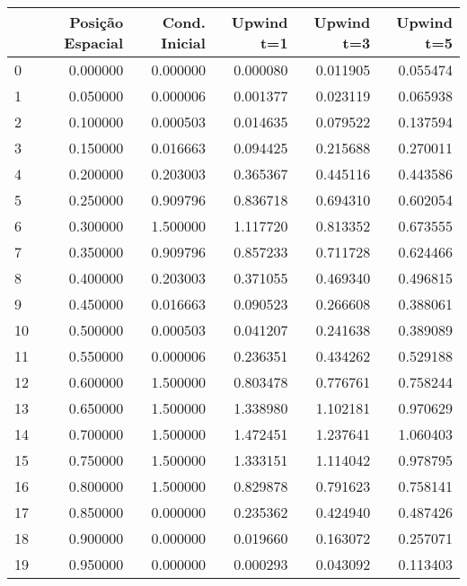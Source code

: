 \begin{tabular}{lrrrrr}
\toprule
 & Posição Espacial & Cond. Inicial & Upwind t=1 & Upwind t=3 & Upwind t=5 \\
\midrule
0 & 0.000000 & 0.000000 & 0.000080 & 0.011905 & 0.055474 \\
1 & 0.050000 & 0.000006 & 0.001377 & 0.023119 & 0.065938 \\
2 & 0.100000 & 0.000503 & 0.014635 & 0.079522 & 0.137594 \\
3 & 0.150000 & 0.016663 & 0.094425 & 0.215688 & 0.270011 \\
4 & 0.200000 & 0.203003 & 0.365367 & 0.445116 & 0.443586 \\
5 & 0.250000 & 0.909796 & 0.836718 & 0.694310 & 0.602054 \\
6 & 0.300000 & 1.500000 & 1.117720 & 0.813352 & 0.673555 \\
7 & 0.350000 & 0.909796 & 0.857233 & 0.711728 & 0.624466 \\
8 & 0.400000 & 0.203003 & 0.371055 & 0.469340 & 0.496815 \\
9 & 0.450000 & 0.016663 & 0.090523 & 0.266608 & 0.388061 \\
10 & 0.500000 & 0.000503 & 0.041207 & 0.241638 & 0.389089 \\
11 & 0.550000 & 0.000006 & 0.236351 & 0.434262 & 0.529188 \\
12 & 0.600000 & 1.500000 & 0.803478 & 0.776761 & 0.758244 \\
13 & 0.650000 & 1.500000 & 1.338980 & 1.102181 & 0.970629 \\
14 & 0.700000 & 1.500000 & 1.472451 & 1.237641 & 1.060403 \\
15 & 0.750000 & 1.500000 & 1.333151 & 1.114042 & 0.978795 \\
16 & 0.800000 & 1.500000 & 0.829878 & 0.791623 & 0.758141 \\
17 & 0.850000 & 0.000000 & 0.235362 & 0.424940 & 0.487426 \\
18 & 0.900000 & 0.000000 & 0.019660 & 0.163072 & 0.257071 \\
19 & 0.950000 & 0.000000 & 0.000293 & 0.043092 & 0.113403 \\
\bottomrule
\end{tabular}
